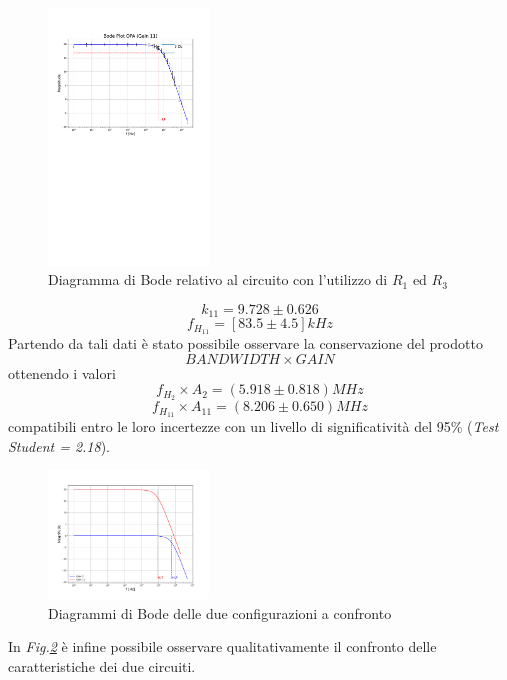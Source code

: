 \documentclass[journal]{IEEEtran}
\begin{document}
\begin{figure}[H]%
\begin {center}
\includegraphics[width=0.38\textwidth]{analysis/output/OPA-bode_gain11(mag).pdf}
\caption{Diagramma di Bode relativo al circuito con l'utilizzo di $R_1$ ed $R_3$ }
\label{fig:gain11}
\end {center}
\end{figure}
\[k_{11} = 9.728 \pm 0.626\] 
\[f_{H_{11}} = [ 83.5 \pm 4.5 ]kHz\]
Partendo da tali dati è stato possibile osservare la conservazione del prodotto 
\[BAND WIDTH \times GAIN\]
ottenendo i valori \[f_{H_{2}} \times A_2 = (5.918 \pm  0.818) MHz\]  \[f_{H_{11}} \times A_{11} = (8.206 \pm 0.650) MHz\] compatibili entro le loro incertezze con un livello di significatività del 95\% (\textit{Test Student = 2.18}).
\begin{figure}[H]%
\begin {center}
\includegraphics[width=0.38\textwidth]{analysis/output/OPA-bode_gain_comparison(mag).pdf}
\caption{Diagrammi di Bode delle due configurazioni a confronto}
\label{fig:gain-compare}
\end {center}
\end{figure}
In \textit{Fig.\ref{fig:gain-compare}} è infine possibile osservare qualitativamente il confronto delle caratteristiche dei due circuiti.
\end{document}
